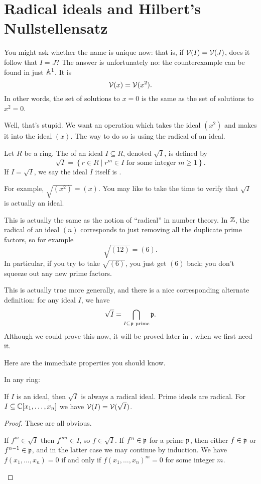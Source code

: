\section{Radical ideals and Hilbert's Nullstellensatz}
You might ask whether the name is unique now:
that is, if $\mathcal V(I) = \mathcal V(J)$, does it follow that $I=J$?
The answer is unfortunately no: the counterexample can be found in just $\mathbb A^1$.
It is
\[ \mathcal V(x) = \mathcal V(x^2). \]
In other words, the set of solutions to $x=0$
is the same as the set of solutions to $x^2=0$.

Well, that's stupid.
We want an operation which takes the ideal $(x^2)$ and makes it into the ideal $(x)$.
The way to do so is using the radical of an ideal.

\begin{definition}
	Let $R$ be a ring.
	The  of an ideal $I \subseteq R$, denoted $\sqrt I$,
	is defined by
	\[ \sqrt I = \left\{ r \in R
			\mid r^m \in I \text{ for some integer $m \ge 1$} \right\}. \]
	If $I = \sqrt I$, we say the ideal $I$ itself is .
\end{definition}
For example, $\sqrt{(x^2)} = (x)$.
You may like to take the time to verify that $\sqrt I$ is actually an ideal.

\begin{remark}
	This is actually the same as the notion of ``radical'' in number theory.
	In $\mathbb Z$, the radical of an ideal $(n)$ corresponds to just
	removing all the duplicate prime factors, so for example
	\[ \sqrt{(12)} = (6). \]
	In particular, if you try to take $\sqrt{(6)}$,
	you just get $(6)$ back;
	you don't squeeze out any new prime factors.

	This is actually true more generally,
	and there is a nice corresponding alternate definition:
	for any ideal $I$, we have
	\[ \sqrt I = \bigcap_{I \subseteq \mathfrak p \text{ prime}} \mathfrak p. \]
	Although we could prove this now,
	it will be proved later in ,
	when we first need it.
\end{remark}

Here are the immediate properties you should know.
\begin{proposition}
	\label{prop:radical}
	In any ring:
	\begin{itemize}
		\ii If $I$ is an ideal, then $\sqrt I$ is always a radical ideal.
		\ii Prime ideals are radical.
		\ii For $I \subseteq \mathbb C[x_1, \dots, x_n]$
		we have $\mathcal V(I) = \mathcal V(\sqrt I)$.
	\end{itemize}
\end{proposition}
\begin{proof}
	These are all obvious.
	\begin{itemize}
		\ii If $f^m \in \sqrt I$ then $f^{mn} \in I$, so $f \in \sqrt I$.
		\ii If $f^n \in \mathfrak p$ for a prime $\mathfrak p$,
		then either $f \in \mathfrak p$ or $f^{n-1} \in \mathfrak p$,
		and in the latter case we may continue by induction.
		\ii We have $f(x_1, \dots, x_n) = 0$
		if and only if $f(x_1, \dots, x_n)^m = 0$ for some integer $m$.
		\qedhere
	\end{itemize}
\end{proof}

